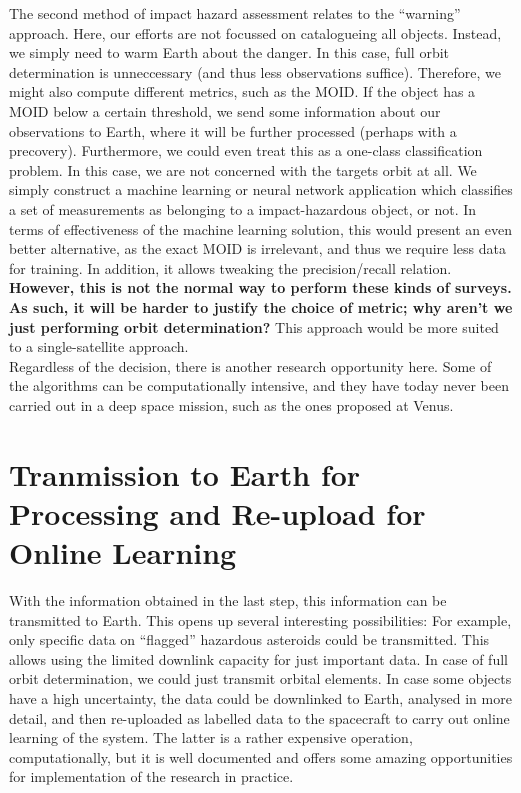 \documentclass[a4paper,10pt]{article}
\begin{document}
The second method of impact hazard assessment relates to the ``warning'' approach. Here, our efforts are not focussed on catalogueing all objects. Instead, we simply need to warm Earth about the danger. In this case, full orbit determination is unneccessary (and thus less observations suffice). Therefore, we might also compute different metrics, such as the MOID. If the object has a MOID below a certain threshold, we send some information about our observations to Earth, where it will be further processed (perhaps with a precovery). Furthermore, we could even treat this as a one-class classification problem. In this case, we are not concerned with the targets orbit at all. We simply construct a machine learning or neural network application which classifies a set of measurements as belonging to a impact-hazardous object, or not. In terms of effectiveness of the machine learning solution, this would present an even better alternative, as the exact MOID is irrelevant, and thus we require less data for training. In addition, it allows tweaking the precision/recall relation. \textbf{However, this is not the normal way to perform these kinds of surveys. As such, it will be harder to justify the choice of metric; why aren't we just performing orbit determination?} This approach would be more suited to a single-satellite approach.\\

Regardless of the decision, there is another research opportunity here. Some of the algorithms can be computationally intensive, and they have today never been carried out in a deep space mission, such as the ones proposed at Venus.

\section{Tranmission to Earth for Processing and Re-upload for Online Learning}
With the information obtained in the last step, this information can be transmitted to Earth. This opens up several interesting possibilities: For example, only specific data on ``flagged'' hazardous asteroids could be transmitted. This allows using the limited downlink capacity for just important data. In case of full orbit determination, we could just transmit orbital elements. In case some objects have a high uncertainty, the data could be downlinked to Earth, analysed in more detail, and then re-uploaded as labelled data to the spacecraft to carry out online learning of the system. The latter is a rather expensive operation, computationally, but it is well documented and offers some amazing opportunities for implementation of the research in practice.
\end{document}
